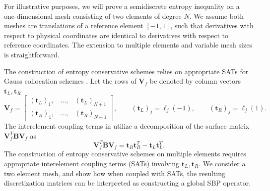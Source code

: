 \documentclass[review,onefignum,onetabnum,final]{siamart171218}
\newcommand{\LRp}[1]{\left( #1 \right)}
\newcommand*{\horzbar}{\rule[.5ex]{2.5ex}{0.5pt}}
\begin{document}
For illustrative purposes, we will prove a semidiscrete entropy inequality on a one-dimensional mesh consisting of two elements of degree $N$.  We assume both meshes are translations of a reference element  $[-1,1]$, such that derivatives with respect to physical coordinates are identical to derivatives with respect to reference coordinates.  The extension to multiple elements and variable mesh sizes is straightforward.  

The construction of entropy conservative schemes relies on appropriate SATs for Gauss collocation schemes \cite{fernandez2014review, crean2017high, fernandez2018simultaneous}.  Let the rows of $\bm{V}_f$ be denoted by column vectors $\bm{t}_L, \bm{t}_R$ 
\[
\bm{V}_f = \begin{bmatrix}
\LRp{\bm{t}_L}_1, & \ldots, & \LRp{\bm{t}_L}_{N+1}\\
\LRp{\bm{t}_R}_1, & \ldots, & \LRp{\bm{t}_R}_{N+1}
\end{bmatrix}, \qquad \LRp{\bm{t}_L}_j = \ell_j(-1), \qquad \LRp{\bm{t}_R}_j = \ell_j(1).
\]
The interelement coupling terms in \cite{fernandez2014review, crean2017high, fernandez2018simultaneous} utilize a decomposition of the surface matrix $\bm{V}_f^T\bm{B}\bm{V}_f$ as  
\begin{equation}
\bm{V}_f^T\bm{B}\bm{V}_f 
= \bm{t}_R\bm{t}_R^T - \bm{t}_L\bm{t}_L^T.
\label{eq:bmatdecomp}
\end{equation}
The construction of entropy conservative schemes on multiple elements requires appropriate interelement coupling terms (SATs) involving $\bm{t}_L, \bm{t}_R$.  We consider a two element mesh, and show how when coupled with SATs, the resulting discretization matrices can be interpreted as constructing a global SBP operator.  
\end{document}
